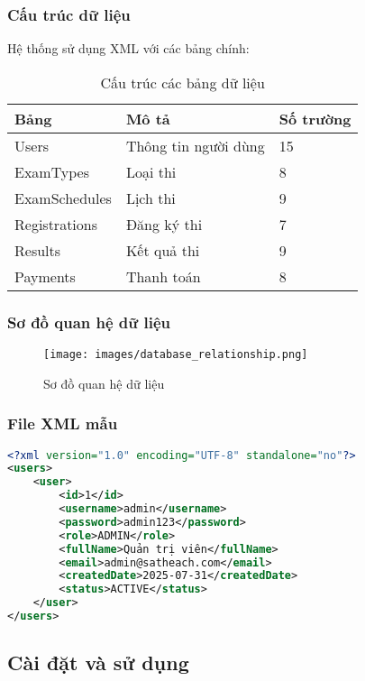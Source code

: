 \documentclass[12pt,a4paper]{article}
\begin{document}
\subsubsection{Cấu trúc dữ liệu}

Hệ thống sử dụng XML với các bảng chính:

\begin{table}[H]
\centering
\begin{tabular}{|l|l|l|}
\hline
\textbf{Bảng} & \textbf{Mô tả} & \textbf{Số trường} \\
\hline
Users & Thông tin người dùng & 15 \\
\hline
ExamTypes & Loại thi & 8 \\
\hline
ExamSchedules & Lịch thi & 9 \\
\hline
Registrations & Đăng ký thi & 7 \\
\hline
Results & Kết quả thi & 9 \\
\hline
Payments & Thanh toán & 8 \\
\hline
\end{tabular}
\caption{Cấu trúc các bảng dữ liệu}
\label{tab:database_structure}
\end{table}

\subsubsection{Sơ đồ quan hệ dữ liệu}

\begin{figure}[H]
\centering
\texttt{[image: images/database\_relationship.png]}
\caption{Sơ đồ quan hệ dữ liệu}
\label{fig:database_relationship}
\end{figure}

\subsubsection{File XML mẫu}

\begin{lstlisting}[language=XML, caption=File users.xml mẫu]
<?xml version="1.0" encoding="UTF-8" standalone="no"?>
<users>
    <user>
        <id>1</id>
        <username>admin</username>
        <password>admin123</password>
        <role>ADMIN</role>
        <fullName>Quản trị viên</fullName>
        <email>admin@satheach.com</email>
        <createdDate>2025-07-31</createdDate>
        <status>ACTIVE</status>
    </user>
</users>
\end{lstlisting}

\subsection{Cài đặt và sử dụng}
\end{document}
